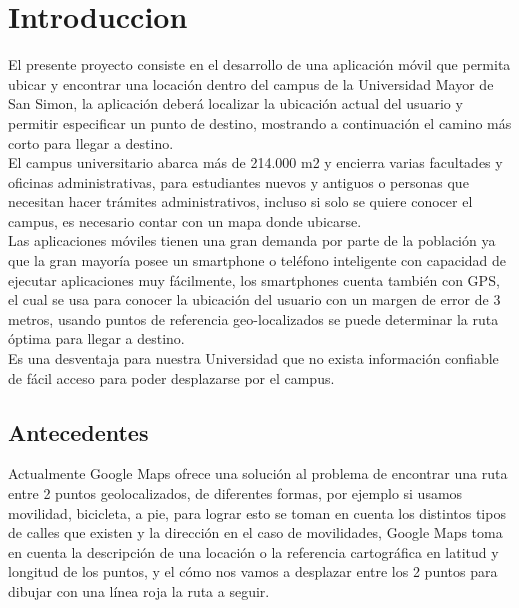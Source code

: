 \chapter{Introduccion} %
\label{cha:introduccion}

El presente proyecto consiste en el desarrollo de una aplicación móvil que permita ubicar y encontrar una locación dentro del campus de la Universidad Mayor de San Simon, la aplicación deberá localizar la ubicación actual del usuario y permitir especificar un punto de destino, mostrando a continuación el camino más corto para llegar a destino.\\

El campus universitario abarca más de 214.000 m2 y encierra varias facultades y
oficinas administrativas, para estudiantes nuevos y antiguos o personas que
necesitan hacer trámites administrativos, incluso si solo se quiere conocer el
campus, es necesario contar con un mapa donde ubicarse.\\

Las aplicaciones móviles tienen una gran demanda por parte de la población ya
que la gran mayoría posee un smartphone o teléfono inteligente con capacidad de
ejecutar aplicaciones muy fácilmente, los smartphones cuenta también con GPS,
el cual se usa para conocer la ubicación del usuario con un margen de error de
3 metros, usando puntos de referencia geo-localizados se puede determinar la
ruta óptima para llegar a destino.\\


Es una desventaja para nuestra Universidad que no exista información confiable
de fácil acceso para poder desplazarse por el campus.\\

  \section{Antecedentes} %
  \label{sec:antecedentes}
  Actualmente Google Maps ofrece una solución al problema de encontrar una ruta entre 2 puntos geolocalizados, de diferentes formas, por ejemplo si usamos movilidad, bicicleta, a pie, para lograr esto se toman en cuenta los distintos tipos de calles que existen y la dirección en el caso de movilidades, Google Maps toma en cuenta la descripción de una locación o la referencia cartográfica en latitud y longitud de los puntos, y el cómo nos vamos a desplazar entre los 2 puntos para dibujar con una línea roja la ruta a seguir.\\


